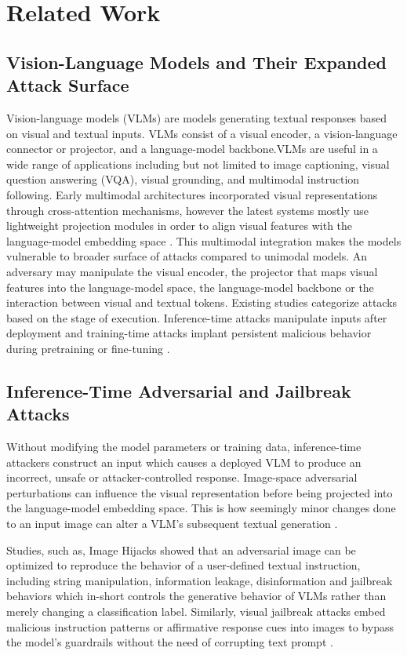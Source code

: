 \documentclass[lettersize,journal]{IEEEtran}
\begin{document}
\section{Related Work}
\subsection{Vision-Language Models and Their Expanded Attack Surface}
Vision-language models (VLMs) are models generating textual responses based on visual and textual inputs. VLMs consist of a visual encoder, a vision-language connector or projector, and a language-model backbone.VLMs are useful in a wide range of applications including but not limited to image captioning, visual question answering (VQA), visual grounding, and multimodal instruction following. Early multimodal architectures incorporated visual representations through cross-attention mechanisms, however the latest systems mostly use lightweight projection modules in order to align visual features with the language-model embedding space \cite{Radford2021CLIP,Dai2023InstructBLIP,Liu2023LLaVA,Liu2024LLaVAImproved,Bai2025Qwen25VL}. This multimodal integration makes the models vulnerable to broader surface of attacks compared to unimodal models. An adversary may manipulate the visual encoder, the projector that maps visual features into the language-model space, the language-model backbone or the interaction between visual and textual tokens. Existing studies categorize attacks based on the stage of execution. Inference-time attacks manipulate inputs after deployment and training-time attacks implant persistent malicious behavior during pretraining or fine-tuning \cite{Liu2024Survey,Li2025BackdoorVLM}.   

\subsection{Inference-Time Adversarial and Jailbreak Attacks}


Without modifying the model parameters or training data, inference-time attackers construct an input which causes a deployed VLM to produce an incorrect, unsafe or attacker-controlled response. Image-space adversarial perturbations can influence the visual representation before being projected into the language-model embedding space. This is how seemingly minor changes done to an input image can alter a VLM's subsequent textual generation \cite{Zhao2023AttackVLM,Guo2024AdvDiffVLM}.

Studies, such as, Image Hijacks showed that an adversarial image can be optimized to reproduce the behavior of a user-defined textual instruction, including string manipulation, information leakage, disinformation and jailbreak behaviors which in-short controls the generative behavior of VLMs rather than merely changing a classification label. Similarly, visual jailbreak attacks embed malicious instruction patterns or affirmative response cues into images to bypass the model's guardrails without the need of corrupting text prompt \cite{Qi2024ImgTrojan,Liu2025VisualDAN}.
\end{document}
